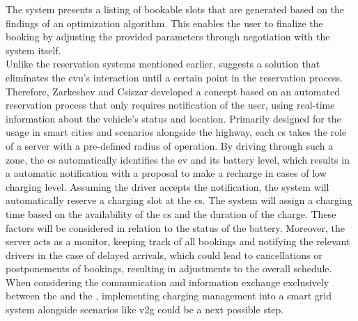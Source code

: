 The system presents a listing of bookable slots that are generated based on the findings of an optimization algorithm. This enables the user to finalize the booking by adjusting the provided parameters through negotiation with the system itself. \\
\noindent Unlike the reservation systems mentioned earlier, \cite{zarkeshev_charging_2018} suggests a solution that eliminates the \acrshort{evu}'s interaction until a certain point in the reservation process.
Therefore, Zarkeshev and Csiszar developed a concept based on an automated reservation process that only requires notification of the user, using real-time information about the vehicle's status and location.
Primarily designed for the usage in smart cities and scenarios alongside the highway, each \acrshort{cs} takes the role of a server with a pre-defined radius of operation. By driving through such a zone, the \acrshort{cs} automatically identifies the \acrshort{ev} and its battery level, which results in a automatic notification with a proposal to make a recharge in cases of low charging level. 
Assuming the driver accepts the notification, the system will automatically reserve a charging slot at the \acrshort{cs}. The system will assign a charging time based on the availability of the \acrshort{cs} and the duration of the charge. These factors will be considered in relation to the status of the battery.
Moreover, the server acts as a monitor, keeping track of all bookings and notifying the relevant drivers in the case of delayed arrivals, which could lead to cancellations or postponements of bookings, resulting in adjustments to the overall schedule. \\
\noindent When considering the communication and information exchange exclusively between the  and the , implementing charging management into a smart grid system alongside scenarios like \acrshort{v2g} could be a next possible step. 
